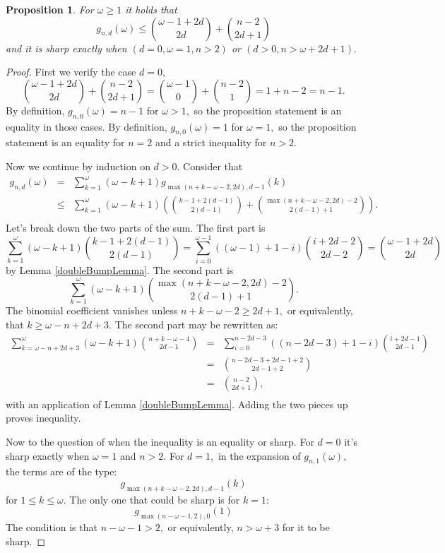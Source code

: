 \documentclass{article}
\theoremstyle{plain}
\newtheorem{prop}[thm]{Proposition}
\theoremstyle{definition}
\begin{document}
\begin{prop}\label{prepp} For $\omega \geq 1$ it holds that
\[ g_{n,d}(\omega) \leq {\omega-1+2d \choose 2d} +  {n-2 \choose 2d+1} \]
and it is sharp exactly when $(d=0, \omega =1, n>2)$ or $(d>0, n>\omega+2d+1).$
\end{prop}
\begin{proof} First we verify the case $d=0,$
\[
{\omega-1+2d \choose 2d} +  {n-2 \choose 2d+1} = {\omega-1 \choose 0} +  {n-2 \choose 1} = 1 + n -2= n-1.
\]
By definition, $g_{n,0}(\omega)=n-1$ for $\omega>1,$ so the proposition statement is an equality in those cases. 
By definition, $g_{n,0}(\omega)=1$ for $\omega=1,$ so the proposition statement is an equality for $n=2$ and a strict inequality for $n>2.$

Now we continue by induction on $d>0.$ Consider that 
\[  \begin{array}{rcl}
g_{n,d}(\omega) & = &  \displaystyle \sum_{k=1}^{\omega} (\omega-k+1) g_{\max(n+k-\omega-2,2d),d-1}( k )  \\
& \leq & \displaystyle \sum_{k=1}^{\omega} (\omega-k+1) \left(    {k-1+2(d-1) \choose 2(d-1)} +  {\max(n+k-\omega-2,2d) -2 \choose 2(d-1)+1}     \right). \\
\end{array} \]
Let's break down the two parts of the sum. The first part is 
\[
\sum_{k=1}^{\omega} (\omega-k+1)   {k-1+2(d-1) \choose 2(d-1)}  = \sum_{i=0}^{\omega-1} ((\omega-1)+1-i)   {i+2d-2 \choose 2d-2}  = { \omega - 1 +2d \choose 2d }
\]
by Lemma \ref{doubleBumpLemma}. The second part is 
\[
\sum_{k=1}^{\omega} (\omega-k+1)  {\max(n+k-\omega-2,2d) -2 \choose 2(d-1)+1}.
\]
The binomial coefficient vanishes unless $n+k-\omega-2 \geq 2d+1,$ or equivalently, that $k \geq \omega - n + 2d + 3.$ The second part may be rewritten as:
\[
\begin{array}{rcl}
\displaystyle  \sum_{k=\omega - n + 2d + 3}^{\omega} (\omega-k+1)  {n+k-\omega-4 \choose 2d-1} &  = & \displaystyle  \sum_{i=0}^{n - 2d - 3} ((n - 2d - 3)+1-i)  {i + 2d -1 \choose 2d-1}    \\
    & = & \displaystyle  {n - 2d - 3 + 2d -1 +2  \choose 2d-1 + 2 }    \\
    & = & \displaystyle  {n -2   \choose 2d+1 },    \\
\end{array}
\]
with an application of Lemma \ref{doubleBumpLemma}. Adding the two pieces up proves inequality.

Now to the question of when the inequality is an equality or sharp. For $d=0$ it's sharp exactly when $\omega=1$ and $n>2.$ For $d=1,$ in the expansion of $g_{n,1}(\omega),$ the terms are of the type:
\[ g_{\max(n+k-\omega-2,2d),d-1}( k ) \]
for $1 \leq k \leq \omega .$ The only one that could be sharp is for $k=1:$
\[ g_{\max(n-\omega-1,2),0}( 1 ) \]
The condition is that $n-\omega-1>2,$ or equivalently,  $n>\omega+3 $ for it to be sharp. 


\end{proof}
\end{document}
